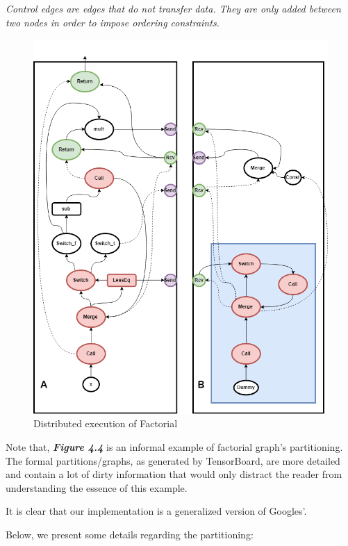 \documentclass[ack,preface]{dithesis}
\begin{document}
\textit{Control edges are edges that do not transfer data. They are only added between two nodes in order to impose ordering constraints.}

\begin{figure}
\centering
\includegraphics[scale=0.6]{figures/DistrFac}
\caption{Distributed execution of Factorial}
\end{figure}

Note that, \textit{\textbf{Figure 4.4}} is an informal example of factorial graph's partitioning. The formal partitions/graphs, as generated by TensorBoard, are more detailed and contain a lot of dirty information that would only distract the reader from understanding the essence of this example. 

It is clear that our implementation is a generalized version of Googles'. 

Below, we present some details regarding the partitioning:
    
\end{document}
